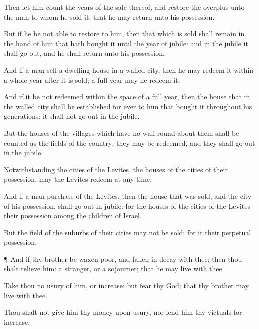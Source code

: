 {Then let him
count the
years of the
sale thereof, and
restore the
overplus unto the
man to whom he
sold it; that he may
return unto his
possession.

But if
he be not
able to
restore
{} to him, then that which is
sold shall remain in the
hand of him that hath
bought it until the
year of
jubile: and in the
jubile it shall go
out, and he shall
return unto his
possession.

And if a
man
sell a
dwelling
house in a
walled
city, then he may
redeem it within a
whole
year after it is
sold;
{} a full
year may he
redeem it.

And if it be not
redeemed within the
space of a
full
year, then the
house that
{} in the
walled
city shall be
established for
ever to him that
bought it throughout his
generations: it shall not go
out in the
jubile.

But the
houses of the
villages which have no
wall round
about them shall be
counted as the
fields of the
country: they may be
redeemed, and they shall go
out in the
jubile.

Notwithstanding the
cities of the
Levites,
{} the
houses of the
cities of their
possession, may the
Levites
redeem at any
time.

And if a man
purchase of the
Levites, then the
house that was
sold, and the
city of his
possession, shall go
out in
{}
jubile: for the
houses of the
cities of the
Levites
{} their
possession
among the
children of
Israel.

But the
field of the
suburbs of their
cities may not be
sold; for it
{} their
perpetual
possession.


\par }{\PP {}¶ And if thy
brother be waxen
poor, and fallen in
decay with
thee; then thou shalt
relieve him:
{} a
stranger, or a
sojourner; that he may
live with thee.

Take thou no
usury of him, or
increase: but
fear thy
God; that thy
brother may
live with thee.

Thou shalt not
give him thy
money upon
usury, nor
lend him thy
victuals for
increase.

}
